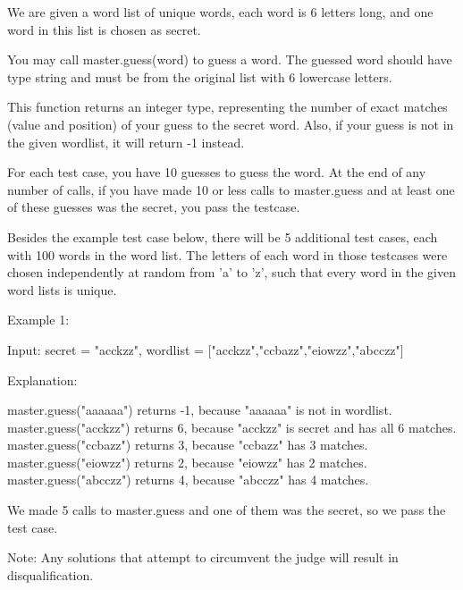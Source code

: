 We are given a word list of unique words, each word is 6 letters long, and one word in this list is chosen as secret.

You may call master.guess(word) to guess a word.  The guessed word should have type string and must be from the original list with 6 lowercase letters.

This function returns an integer type, representing the number of exact matches (value and position) of your guess to the secret word.  Also, if your guess is not in the given wordlist, it will return -1 instead.

For each test case, you have 10 guesses to guess the word. At the end of any number of calls, if you have made 10 or less calls to master.guess and at least one of these guesses was the secret, you pass the testcase.

Besides the example test case below, there will be 5 additional test cases, each with 100 words in the word list.  The letters of each word in those testcases were chosen independently at random from 'a' to 'z', such that every word in the given word lists is unique.

Example 1:
\begin{Code}
Input: secret = "acckzz", wordlist = ["acckzz","ccbazz","eiowzz","abcczz"]

Explanation:

master.guess("aaaaaa") returns -1, because "aaaaaa" is not in wordlist.
master.guess("acckzz") returns 6, because "acckzz" is secret and has all 6 matches.
master.guess("ccbazz") returns 3, because "ccbazz" has 3 matches.
master.guess("eiowzz") returns 2, because "eiowzz" has 2 matches.
master.guess("abcczz") returns 4, because "abcczz" has 4 matches.

We made 5 calls to master.guess and one of them was the secret, so we pass the test case.
\end{Code}


Note:
Any solutions that attempt to circumvent the judge will result in disqualification.

